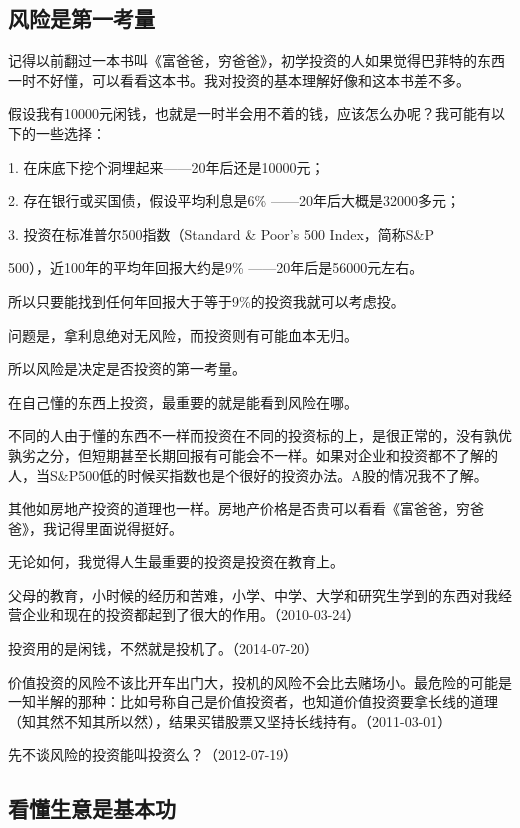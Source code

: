 \subsection{风险是第一考量}

记得以前翻过一本书叫《富爸爸，穷爸爸》，初学投资的人如果觉得巴菲特的东西一时不好懂，可以看看这本书。我对投资的基本理解好像和这本书差不多。

假设我有10000元闲钱，也就是一时半会用不着的钱，应该怎么办呢？我可能有以下的一些选择：

1. 在床底下挖个洞埋起来——20年后还是10000元；

2. 存在银行或买国债，假设平均利息是6\% ——20年后大概是32000多元；

3. 投资在标准普尔500指数（Standard \& Poor's 500 Index，简称S\&P

500），近100年的平均年回报大约是9\% ——20年后是56000元左右。

所以只要能找到任何年回报大于等于9\%的投资我就可以考虑投。

问题是，拿利息绝对无风险，而投资则有可能血本无归。

所以风险是决定是否投资的第一考量。

在自己懂的东西上投资，最重要的就是能看到风险在哪。

不同的人由于懂的东西不一样而投资在不同的投资标的上，是很正常的，没有孰优孰劣之分，但短期甚至长期回报有可能会不一样。如果对企业和投资都不了解的人，当S\&P500低的时候买指数也是个很好的投资办法。A股的情况我不了解。

其他如房地产投资的道理也一样。房地产价格是否贵可以看看《富爸爸，穷爸爸》，我记得里面说得挺好。

无论如何，我觉得人生最重要的投资是投资在教育上。

父母的教育，小时候的经历和苦难，小学、中学、大学和研究生学到的东西对我经营企业和现在的投资都起到了很大的作用。（2010-03-24）

投资用的是闲钱，不然就是投机了。（2014-07-20）

价值投资的风险不该比开车出门大，投机的风险不会比去赌场小。最危险的可能是一知半解的那种：比如号称自己是价值投资者，也知道价值投资要拿长线的道理（知其然不知其所以然），结果买错股票又坚持长线持有。（2011-03-01）


先不谈风险的投资能叫投资么？（2012-07-19）

\subsection{看懂生意是基本功}

